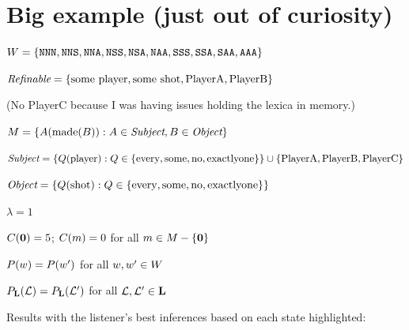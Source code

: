 \documentclass{article}
\begin{document}

\section{Big example (just out of curiosity)}

\begin{examples}
\item

 \begin{examples}
  \item $W = \left\{ \texttt{NNN}, \texttt{NNS}, \texttt{NNA}, \texttt{NSS}, \texttt{NSA}, \texttt{NAA}, \texttt{SSS}, \texttt{SSA}, \texttt{SAA}, \texttt{AAA} \right\}$    
  \item $\textit{Refinable} = \left\{ \text{some player}, \text{some shot}, \text{PlayerA}, \text{PlayerB} \right\}$
  
    (No PlayerC because I was having issues holding the lexica in
    memory.)

  \item $M = \left\{ A(\text{made}(B)) : A \in\textit{Subject}, B \in  \textit{Object} \right\}$
    \begin{examples}
    \item $\textit{Subject} = \left\{ Q(\text{player}) : Q \in \left\{ \text{every}, \text{some}, \text{no}, \text{exactlyone} \right\} \right\} \cup \left\{ \text{PlayerA}, \text{PlayerB}, \text{PlayerC} \right\}$
    \item $\textit{Object} = \left\{ Q(\text{shot}) : Q \in \left\{ \text{every}, \text{some}, \text{no}, \text{exactlyone} \right\} \right\}$
    \end{examples}
  \item $\lambda = 1$
  \item $C(\mathbf{0}) = 5$; $C(m) = 0$ for all $m \in M-\left\{ \mathbf{0} \right\}$  
  \item $P(w) = P(w')$ for all $w, w' \in W$
  \item $P_{\mathbf{L}}(\mathcal{L}) = P_{\mathbf{L}}(\mathcal{L}')$ for all $\mathcal{L}, \mathcal{L}' \in \mathbf{L}$
  \end{examples}

\item Results with the listener's best inferences based on each state
  highlighted: 


\end{examples}
\end{document}
